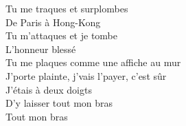 Tu me traques et surplombes \\
De Paris à Hong-Kong \\
Tu m'attaques et je tombe \\
L'honneur blessé \\
Tu me plaques comme une affiche au mur \\
J'porte plainte, j'vais l'payer, c'est sûr \\
J'étais à deux doigts \\
D'y laisser tout mon bras \\
Tout mon bras \\
